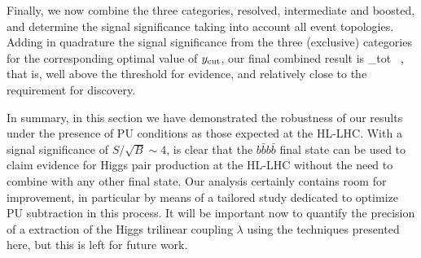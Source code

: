 Finally, we now combine the three categories, resolved,
intermediate and boosted, and determine the signal
significance taking into account all event topologies.
%
Adding in quadrature the signal significance from the three
(exclusive) categories for the corresponding
optimal value of $y_{\rm cut}$, our final combined result is
\be
\lp {}\rp_{\rm tot}  \, ,
\ee
that is, well
above the threshold for evidence, and  relatively close to the
requirement for discovery.
%

In summary, in this section we have demonstrated the robustness
of our results under the presence of PU conditions as those
expected at the HL-LHC.
%
With a signal significance of $S/\sqrt{B}\sim 4$, is clear that
the $b\bar{b}b\bar{b}$ final state can be used to claim evidence
for Higgs pair production at the HL-LHC without the need
to combine with any other final state.
%
Our analysis certainly contains
room for improvement, in particular by means of a tailored
study dedicated to optimize PU subtraction in this process.
%
It will be important now to quantify the precision of
a extraction of the Higgs trilinear coupling $\lambda$ using
the techniques presented here, but this is left for future work.

